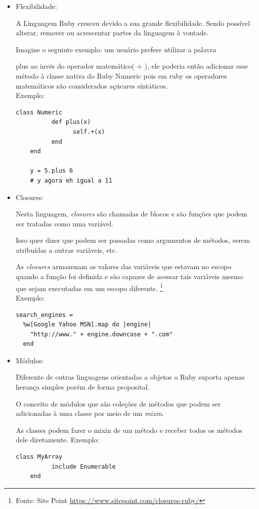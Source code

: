 \begin{itemize}
\item{Flexibilidade:}
    \par A Linguagem Ruby cresceu devido a sua grande flexibilidade. Sendo possível alterar, remover ou acrescentar partes da linguagem à vontade.
    \par Imagine o seguinte exemplo: um usuário prefere utilizar a palavra \par{plus} ao invés do operador matemático(  +  ), ele poderia então adicionar esse método à classe nativa do Ruby Numeric pois em ruby os operadores matemáticos são considerados açúcares sintáticos.
\\Exemplo:
\begin{lstlisting}[frame=single]
class Numeric
          def plus(x)
                self.+(x)
          end
    end

    y = 5.plus 6
    # y agora eh igual a 11
\end{lstlisting}
\item{Closures:}
    \par Nesta linguagem, \emph{closures} são chamadas de blocos e são funções que podem ser tratadas como uma variável.
    \par Isso quer dizer que podem ser passadas como argumentos de métodos, serem atribuídas a outras variáveis, etc.
    \par As \emph{closures} armazenam os valores das variáveis que estavam no escopo quando a função foi definida e são capazes de acessar tais variáveis mesmo que sejam executadas em um escopo diferente. \footnote{Fonte: Site Point \url{https://www.sitepoint.com/closures-ruby/}}
\\
Exemplo:
\begin{lstlisting}[frame=single]
search_engines =
  %w[Google Yahoo MSN].map do |engine|
    "http://www." + engine.downcase + ".com"
  end
\end{lstlisting}
\item{Módulos:}
    \par Diferente de outras linguagens orientadas a objetos o Ruby suporta apenas herança simples porém de forma proposital.
    \par O conceito de módulos que são coleções de métodos que podem ser adicionadas à uma classe por meio de um \emph{mixin}.
    \par As classes podem fazer o mixin de um método e receber todos os métodos dele diretamente.
Exemplo:
\begin{lstlisting}[frame=single]
class MyArray
          include Enumerable
    end
\end{lstlisting}

\end{itemize}
